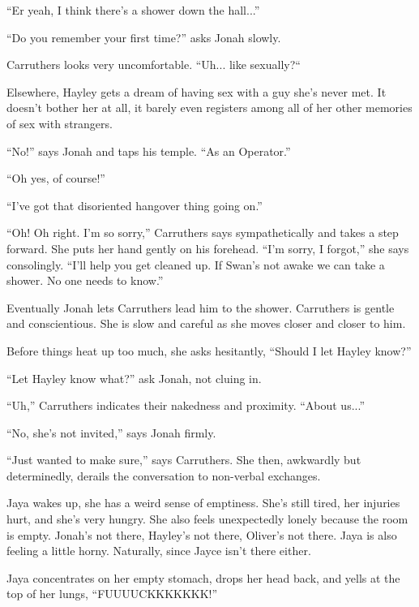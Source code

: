 ``Er yeah, I think there's a shower down the hall...''

``Do you remember your first time?'' asks Jonah slowly.

Carruthers looks very uncomfortable.  ``Uh... like sexually?``



Elsewhere, Hayley gets a dream of having sex with a guy she's never met.  It doesn't bother her at all, it barely even registers among all of her other memories of sex with strangers.



``No!'' says Jonah and taps his temple.  ``As an Operator.''

``Oh yes, of course!'' 

``I've got that disoriented hangover thing going on.''

``Oh!  Oh right.  I'm so sorry,'' Carruthers says sympathetically and takes a step forward.  She puts her hand gently on his forehead.  ``I'm sorry, I forgot,'' she says consolingly.  ``I'll help you get cleaned up.  If Swan's not awake we can take a shower.  No one needs to know.''

Eventually Jonah lets Carruthers lead him to the shower.  Carruthers is gentle and conscientious.  She is slow and careful as she moves closer and closer to him.

Before things heat up too much, she asks hesitantly, ``Should I let Hayley know?''

``Let Hayley know what?'' ask Jonah, not cluing in.

``Uh,'' Carruthers indicates their nakedness and proximity.  ``About us...''

``No, she's not invited,'' says Jonah firmly.

``Just wanted to make sure,'' says Carruthers.  She then, awkwardly but determinedly, derails the conversation to non-verbal exchanges.



Jaya wakes up, she has a weird sense of emptiness.  She's still tired, her injuries hurt, and she's very hungry.  She also feels unexpectedly lonely because the room is empty.  Jonah's not there, Hayley's not there, Oliver's not there.  Jaya is also feeling a little horny.  Naturally, since Jayce isn't there either.



Jaya concentrates on her empty stomach, drops her head back, and yells at the top of her lungs, ``FUUUUCKKKKKKK!''

